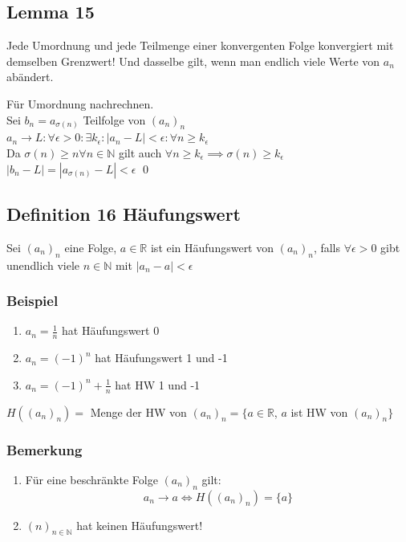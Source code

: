 \documentclass[fleqn]{scrbook}
\renewenvironment{proof}{{\bfseries Beweis }}{\qed}
\begin{document}
\subsection{Lemma 15} Jede Umordnung und jede Teilmenge einer konvergenten Folge konvergiert mit demselben Grenzwert! Und dasselbe gilt, wenn man endlich viele Werte von $a_n$ abändert.

\begin{proof}
Für Umordnung nachrechnen.\\
Sei $b_n = a_{\sigma(n)}$ Teilfolge von $(a_n)_n$\\
$a_n \rightarrow L : \forall \epsilon > 0 : \exists k_\epsilon: |a_n - L| < \epsilon : \forall n \geq k_\epsilon$\\
Da $\sigma(n) \geq n \forall n \in \mathbb{N}$ gilt auch $\forall n \geq k_\epsilon \implies \sigma(n) \geq k_\epsilon $  \\
$|b_n - L| = |a_{\sigma(n)} - L| < \epsilon$
\end{proof}
\subsection{Definition 16 Häufungswert}
Sei $(a_n)_n$ eine Folge, $a\in\mathbb{R}$ ist ein Häufungswert von $(a_n)_n$, falls $\forall \epsilon > 0$ gibt unendlich viele $n\in\mathbb{N}$ mit $|a_n - a| < \epsilon$
\subsubsection{Beispiel} 
\begin{enumerate}
\item $a_n = \frac{1}{n}$ hat Häufungswert 0

\item $a_n = (-1)^n$ hat Häufungswert 1 und -1

\item $a_n = (-1)^n + \frac{1}{n}$ hat HW 1 und -1

\end{enumerate}

$H((a_n)_n) = $ Menge der HW von $(a_n)_n = \{ a\in\mathbb{R}$, $a$ ist HW von $(a_n)_n\}$
\subsubsection{Bemerkung}
\begin{enumerate}[1)]
\item Für eine beschränkte Folge $(a_n)_n$ gilt: $$a_n \rightarrow a \Leftrightarrow H((a_n)_n) = \{a\}$$
\item $(n)_{n\in\mathbb{N}}$ hat keinen Häufungswert!
\end{enumerate}
\end{document}
